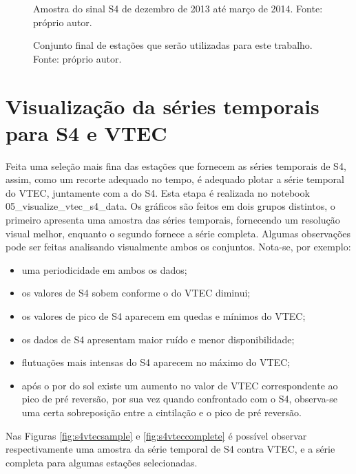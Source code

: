 \begin{figure}[H]
\centering
{}
\caption{Amostra do sinal S4 de dezembro de 2013 até março de 2014. Fonte: próprio autor.}
\label{fig:s4stations}
\end{figure}

\begin{figure}[H]
\centering
\makebox[\textwidth][c]{}
\vspace{-60pt}
\caption{Conjunto final de estações que serão utilizadas para este trabalho. Fonte: próprio autor.}
\label{fig:mapstationsre}
\end{figure}

\section{Visualização da séries temporais para S4 e VTEC}\label{sec:viss4vtec}

Feita uma seleção mais fina das estações que fornecem as séries temporais de S4, assim, como um recorte adequado no tempo, é adequado plotar a série temporal do VTEC, juntamente com a do S4. Esta etapa é realizada no notebook 05\_visualize\_vtec\_s4\_data. Os gráficos são feitos em dois grupos distintos, o primeiro apresenta uma amostra das séries temporais, fornecendo um resolução visual melhor, enquanto o segundo fornece a série completa. Algumas observações pode ser feitas analisando visualmente ambos os conjuntos. Nota-se, por exemplo:

\begin{itemize}
\item uma periodicidade em ambos os dados; 
\item os valores de S4 sobem conforme o do VTEC diminui;
\item os valores de pico de S4 aparecem em quedas e mínimos do VTEC;
\item os dados de S4 apresentam maior ruído e menor disponibilidade;
\item flutuações mais intensas do S4 aparecem no máximo do VTEC;
\item após o por do sol existe um aumento no valor de VTEC correspondente ao pico de pré reversão, por sua vez quando confrontado com o S4, observa-se uma certa sobreposição entre a cintilação e o pico de pré reversão.~
\end{itemize}

Nas Figuras \ref{fig:s4vtecsample} e \ref{fig:s4vteccomplete} é possível observar respectivamente uma amostra da série temporal de S4 contra VTEC, e a série completa para algumas estações selecionadas.

